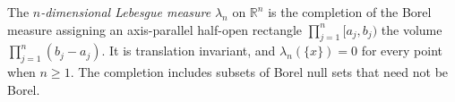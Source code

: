 
The \emph{$n$-dimensional Lebesgue measure} $\lambda_n$ on $\mathbb R^n$ is the completion of the Borel measure assigning an axis-parallel half-open rectangle $\prod_{j=1}^{n}[a_j,b_j)$ the volume $\prod_{j=1}^n(b_j-a_j)$. It is translation invariant, and $\lambda_n(\{x\})=0$ for every point when $n\ge1$. The completion includes subsets of Borel null sets that need not be Borel.
